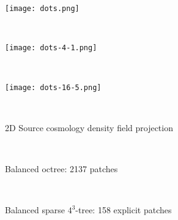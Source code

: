 \documentclass{article}
\begin{document}
\begin{center}
\begin{minipage}{7.0in}
\begin{minipage}{2.2in}
\texttt{[image: dots.png]}
\end{minipage} \ 
\begin{minipage}{2.2in}
\texttt{[image: dots-4-1.png]}
\end{minipage} \ 
\begin{minipage}{2.2in}
\texttt{[image: dots-16-5.png]}
\end{minipage}
\end{minipage} \\
\begin{minipage}{7in}
\begin{minipage}[t]{2.2in}
2D Source cosmology density field projection
\end{minipage} \ 
\begin{minipage}[t]{2.2in}
Balanced octree: 2137 patches
\end{minipage} \ 
\begin{minipage}[t]{2.2in}
Balanced sparse $4^3$-tree: 158 explicit patches
\end{minipage}
\end{minipage}
\end{center}
\end{document}
